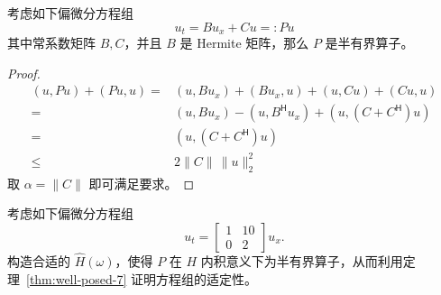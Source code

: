 \begin{example}
    考虑如下偏微分方程组
    \[
        u_t = B u_x + C u =: P u
    \]
    其中常系数矩阵 $B,C$，并且 $B$ 是 Hermite 矩阵，那么 $P$ 是半有界算子。
\end{example}

\begin{proof}
    \begin{align*}
        (u, P u) + (P u, u) ={} & (u, B u_x) + (B u_x, u) + (u, C u) + (C u, u)                  \\
        ={}                     & (u, B u_x) -(u, B^{\mathsf{H}} u_x) + (u, (C+C^{\mathsf{H}})u) \\
        ={}                     & (u, (C+C^{\mathsf{H}})u)                                       \\
        \le                     & 2 \| C \| \, \|u\|_2^2
    \end{align*}
    取 $\alpha = \| C \|$ 即可满足要求。
\end{proof}

\begin{example}
    考虑如下偏微分方程组
    \[
        u_t=
        \begin{bmatrix}
            1 & 10 \\
            0 & 2
        \end{bmatrix} u_x.
    \]
    构造合适的 $\widehat{H}(\omega)$，使得 $P$ 在 $H$ 内积意义下为半有界算子，从而利用定理~\ref{thm:well-posed-7} 证明方程组的适定性。
\end{example}

